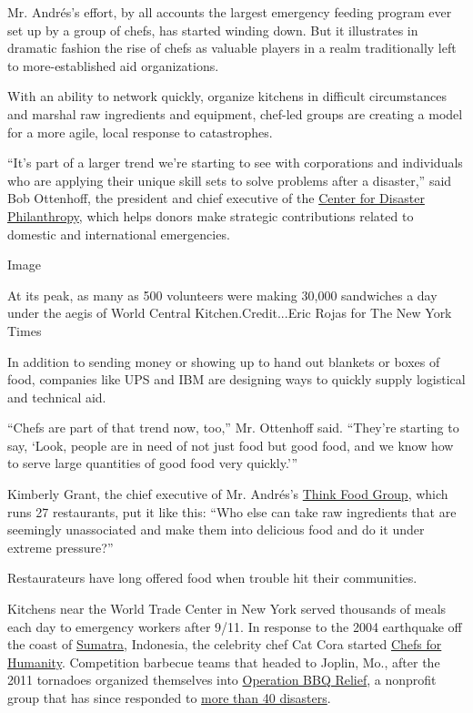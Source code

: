 Mr. Andrés's effort, by all accounts the largest emergency feeding
program ever set up by a group of chefs, has started winding down. But
it illustrates in dramatic fashion the rise of chefs as valuable players
in a realm traditionally left to more-established aid organizations.

With an ability to network quickly, organize kitchens in difficult
circumstances and marshal raw ingredients and equipment, chef-led groups
are creating a model for a more agile, local response to catastrophes.

``It's part of a larger trend we're starting to see with corporations
and individuals who are applying their unique skill sets to solve
problems after a disaster,'' said Bob Ottenhoff, the president and chief
executive of the \href{http://disasterphilanthropy.org/}{Center for
Disaster Philanthropy}, which helps donors make strategic contributions
related to domestic and international emergencies.

Image

At its peak, as many as 500 volunteers were making 30,000 sandwiches a
day under the aegis of World Central Kitchen.Credit...Eric Rojas for The
New York Times

In addition to sending money or showing up to hand out blankets or boxes
of food, companies like UPS and IBM are designing ways to quickly supply
logistical and technical aid.

``Chefs are part of that trend now, too,'' Mr. Ottenhoff said. ``They're
starting to say, `Look, people are in need of not just food but good
food, and we know how to serve large quantities of good food very
quickly.'''

Kimberly Grant, the chief executive of Mr. Andrés's
\href{http://www.thinkfoodgroup.com/}{Think Food Group}, which runs 27
restaurants, put it like this: ``Who else can take raw ingredients that
are seemingly unassociated and make them into delicious food and do it
under extreme pressure?''

Restaurateurs have long offered food when trouble hit their communities.

Kitchens near the World Trade Center in New York served thousands of
meals each day to emergency workers after 9/11. In response to the 2004
earthquake off the coast of
\href{https://en.wikipedia.org/wiki/Sumatra}{Sumatra}, Indonesia, the
celebrity chef Cat Cora started
\href{http://chefsforhumanity.org/}{Chefs for Humanity}. Competition
barbecue teams that headed to Joplin, Mo., after the 2011 tornadoes
organized themselves into
\href{https://operationbbqrelief.org/}{Operation BBQ Relief}, a
nonprofit group that has since responded to
\href{http://www.cnn.com/2017/09/28/us/cnn-hero-stan-hays-operation-bbq-relief/index.html}{more
than 40 disasters}.

